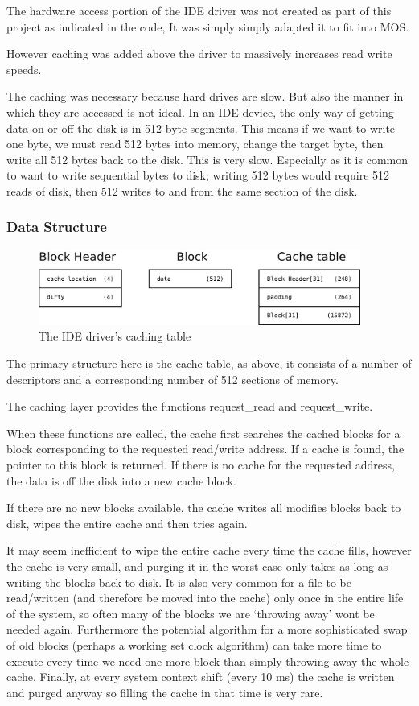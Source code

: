 \documentclass[a4paper]{report}
\begin{document}
The hardware access portion of the IDE driver was not created as part of this project as indicated in the code, It was simply simply adapted it to fit into MOS.

However caching was added above the driver to massively increases read write speeds.

The caching was necessary because hard drives are slow. But also the manner in which they are accessed is not ideal. In an IDE device, the only way of getting data on or off the disk is in 512 byte segments. This means if we want to write one byte, we must read 512 bytes into memory, change the target byte, then write all 512 bytes back to the disk. This is very slow. Especially as it is common to want to write sequential bytes to disk; writing 512 bytes would require 512 reads of disk, then 512 writes to and from the same section of the disk.

\subsubsection{Data Structure}


\begin{figure}[ht]
\centering
\includegraphics[width=400px]{images/Caching_Table}
\caption{The IDE driver's caching table}
\label{fig:WinTitleBarScreen}
\end{figure}

The primary structure here is the cache table, as above, it consists of a number of descriptors and a corresponding number of 512 sections of memory.

The caching layer provides the functions request\_read and request\_write.

When these functions are called, the cache first searches the cached blocks for a block corresponding to the requested read/write address. If a cache is found, the pointer to this block is returned. If there is no cache for the requested address, the data is off the disk into a new cache block.

If there are no new blocks available, the cache writes all modifies blocks back to disk, wipes the entire cache and then tries again.

It may seem inefficient to wipe the entire cache every time the cache fills, however the cache is very small, and purging it in the worst case only takes as long as writing the blocks back to disk. It is also very common for a file to be read/written (and therefore be moved into the cache) only once in the entire life of the system, so often many of the blocks we are `throwing away' wont be needed again. Furthermore the potential algorithm for a more sophisticated swap of old blocks (perhaps a working set clock algorithm) can take more time to execute every time we need one more block than simply throwing away the whole cache. Finally, at every system context shift (every 10 ms) the cache is written and purged anyway so filling the cache in that time is very rare.
\end{document}
